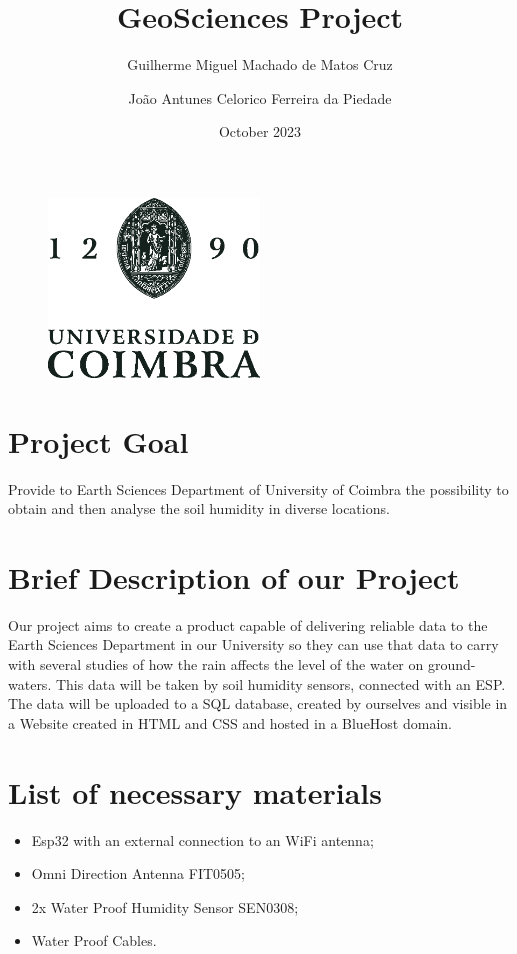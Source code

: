 \documentclass{article}
\begin{document}
\begin{figure}
    \centering
    \includegraphics[width=0.5\textwidth]{UC_V_FundoClaro-negro.eps}
\end{figure}
\linespread{2}
\title{\textbf{ \Huge GeoSciences Project}} 
\author{ Guilherme Miguel Machado de Matos Cruz \and João Antunes Celorico Ferreira da Piedade}

\date{October 2023}



\maketitle
\newpage
\linespread{1}
\section{Project Goal}
Provide to Earth Sciences Department of University of Coimbra the possibility to obtain and then analyse the soil humidity in diverse locations.

\section{Brief Description of our Project}
Our project aims to create a product capable of delivering reliable data to the Earth Sciences Department in our University so they can use that data to carry with several studies of how the rain affects the level of the water on ground-waters. This data will be taken by soil humidity sensors, connected with an ESP. The data will be uploaded to a SQL database, created by ourselves and visible in a Website created in HTML and CSS and hosted in a BlueHost domain.

\section{List of necessary materials}
\begin{itemize}
    \item Esp32 with an external connection to an WiFi antenna;
    \item Omni Direction Antenna FIT0505;
    \item 2x Water Proof Humidity Sensor SEN0308;
    \item Water Proof Cables.
\end{itemize}
\end{document}
